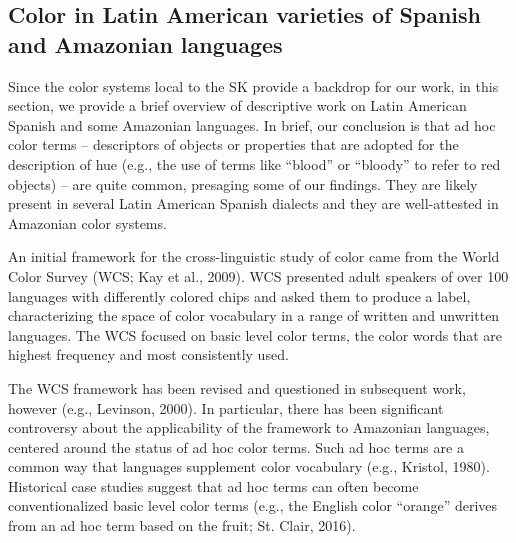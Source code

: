 \documentclass[
  ,apa7,floatsintext]{apa6}
\begin{document}
\hypertarget{color-in-latin-american-varieties-of-spanish-and-amazonian-languages}{%
\subsection{Color in Latin American varieties of Spanish and Amazonian languages}\label{color-in-latin-american-varieties-of-spanish-and-amazonian-languages}}

Since the color systems local to the SK provide a backdrop for our work, in this section, we provide a brief overview of descriptive work on Latin American Spanish and some Amazonian languages. In brief, our conclusion is that ad hoc color terms -- descriptors of objects or properties that are adopted for the description of hue (e.g., the use of terms like ``blood'' or ``bloody'' to refer to red objects) -- are quite common, presaging some of our findings. They are likely present in several Latin American Spanish dialects and they are well-attested in Amazonian color systems.

An initial framework for the cross-linguistic study of color came from the World Color Survey (WCS; Kay et al., 2009). WCS presented adult speakers of over 100 languages with differently colored chips and asked them to produce a label, characterizing the space of color vocabulary in a range of written and unwritten languages. The WCS focused on basic level color terms, the color words that are highest frequency and most consistently used.

The WCS framework has been revised and questioned in subsequent work, however (e.g., Levinson, 2000). In particular, there has been significant controversy about the applicability of the framework to Amazonian languages, centered around the status of ad hoc color terms. Such ad hoc terms are a common way that languages supplement color vocabulary (e.g., Kristol, 1980). Historical case studies suggest that ad hoc terms can often become conventionalized basic level color terms (e.g., the English color ``orange'' derives from an ad hoc term based on the fruit; St. Clair, 2016).
\end{document}

